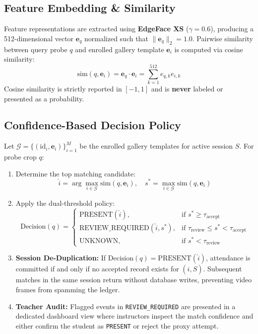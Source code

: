 \documentclass[conference]{IEEEtran}
\begin{document}
\subsection{Feature Embedding \& Similarity}
Feature representations are extracted using \textbf{EdgeFace XS} ($\gamma = 0.6$), producing a 512-dimensional vector $\mathbf{e}_q$ normalized such that $\|\mathbf{e}_q\|_2 = 1.0$. Pairwise similarity between query probe $q$ and enrolled gallery template $\mathbf{e}_i$ is computed via cosine similarity:
\begin{equation}
\text{sim}(q, \mathbf{e}_i) = \mathbf{e}_q \cdot \mathbf{e}_i = \sum_{k=1}^{512} e_{q,k} e_{i,k}
\end{equation}
Cosine similarity is strictly reported in $[-1, 1]$ and is \textbf{never} labeled or presented as a probability.

\subsection{Confidence-Based Decision Policy}
Let $\mathcal{G} = \{(\text{id}_i, \mathbf{e}_i)\}_{i=1}^M$ be the enrolled gallery templates for active session $S$. For probe crop $q$:
\begin{enumerate}
    \item Determine the top matching candidate:
    \begin{equation}
    \hat{i} = \arg\max_{i \in \mathcal{G}} \text{sim}(q, \mathbf{e}_i), \quad s^* = \max_{i \in \mathcal{G}} \text{sim}(q, \mathbf{e}_i)
    \end{equation}
    \item Apply the dual-threshold policy:
    \begin{equation}
    \text{Decision}(q) = \begin{cases} 
    \text{PRESENT}(\hat{i}), & \text{if } s^* \ge \tau_{\text{accept}} \\
    \text{REVIEW\_REQUIRED}(\hat{i}, s^*), & \text{if } \tau_{\text{review}} \le s^* < \tau_{\text{accept}} \\
    \text{UNKNOWN}, & \text{if } s^* < \tau_{\text{review}}
    \end{cases}
    \end{equation}
    \item \textbf{Session De-Duplication:} If $\text{Decision}(q) = \text{PRESENT}(\hat{i})$, attendance is committed if and only if no accepted record exists for $(\hat{i}, S)$. Subsequent matches in the same session return without database writes, preventing video frames from spamming the ledger.
    \item \textbf{Teacher Audit:} Flagged events in \texttt{REVIEW\_REQUIRED} are presented in a dedicated dashboard view where instructors inspect the match confidence and either confirm the student as \texttt{PRESENT} or reject the proxy attempt.
\end{enumerate}
\end{document}
